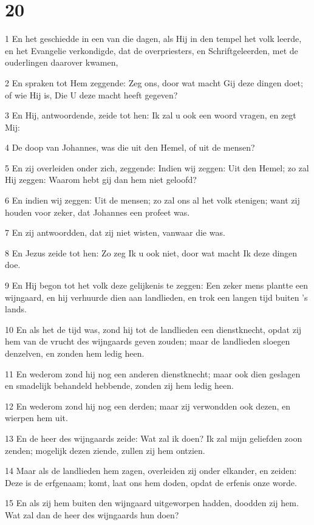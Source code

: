 \chapter{20}

\par 1 En het geschiedde in een van die dagen, als Hij in den tempel het volk leerde, en het Evangelie verkondigde, dat de overpriesters, en Schriftgeleerden, met de ouderlingen daarover kwamen,
\par 2 En spraken tot Hem zeggende: Zeg ons, door wat macht Gij deze dingen doet; of wie Hij is, Die U deze macht heeft gegeven?
\par 3 En Hij, antwoordende, zeide tot hen: Ik zal u ook een woord vragen, en zegt Mij:
\par 4 De doop van Johannes, was die uit den Hemel, of uit de mensen?
\par 5 En zij overleiden onder zich, zeggende: Indien wij zeggen: Uit den Hemel; zo zal Hij zeggen: Waarom hebt gij dan hem niet geloofd?
\par 6 En indien wij zeggen: Uit de mensen; zo zal ons al het volk stenigen; want zij houden voor zeker, dat Johannes een profeet was.
\par 7 En zij antwoordden, dat zij niet wisten, vanwaar die was.
\par 8 En Jezus zeide tot hen: Zo zeg Ik u ook niet, door wat macht Ik deze dingen doe.
\par 9 En Hij begon tot het volk deze gelijkenis te zeggen: Een zeker mens plantte een wijngaard, en hij verhuurde dien aan landlieden, en trok een langen tijd buiten 's lands.
\par 10 En als het de tijd was, zond hij tot de landlieden een dienstknecht, opdat zij hem van de vrucht des wijngaards geven zouden; maar de landlieden sloegen denzelven, en zonden hem ledig heen.
\par 11 En wederom zond hij nog een anderen dienstknecht; maar ook dien geslagen en smadelijk behandeld hebbende, zonden zij hem ledig heen.
\par 12 En wederom zond hij nog een derden; maar zij verwondden ook dezen, en wierpen hem uit.
\par 13 En de heer des wijngaards zeide: Wat zal ik doen? Ik zal mijn geliefden zoon zenden; mogelijk dezen ziende, zullen zij hem ontzien.
\par 14 Maar als de landlieden hem zagen, overleiden zij onder elkander, en zeiden: Deze is de erfgenaam; komt, laat ons hem doden, opdat de erfenis onze worde.
\par 15 En als zij hem buiten den wijngaard uitgeworpen hadden, doodden zij hem. Wat zal dan de heer des wijngaards hun doen?
